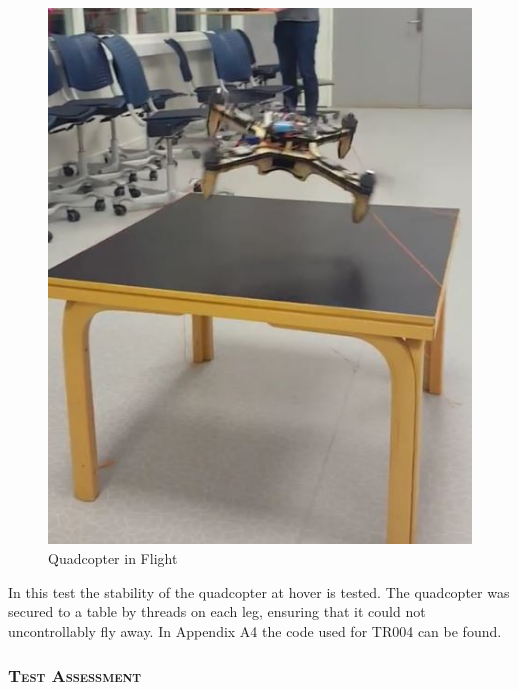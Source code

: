 \begin{figure}[h]
\begin{minipage}[b]{0.45\textwidth}
            \includegraphics[width = 1\textwidth]{VAPIQ-PICTURES/flighttest}
            \caption{Quadcopter in Flight}
            \label{fig:ft2}
        \end{minipage}
\end{figure}

\noindent In this test the stability of the quadcopter at hover is tested. The quadcopter was secured to a table by threads on each leg, ensuring that it could not uncontrollably fly away. In Appendix A4 the code used for TR004 can be found. 

\subsubsection*{\textsc{\medium Test Assessment}}

